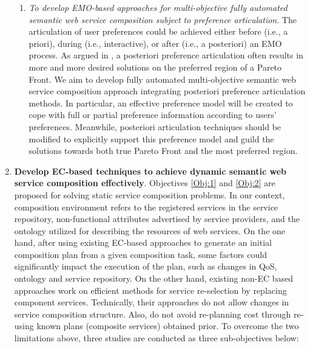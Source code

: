 \begin{enumerate}
\begin{enumerate}
    \item \emph{To develop EMO-based approaches for multi-objective fully automated semantic web service composition subject to preference articulation}.  The articulation of user preferences could be achieved either before (i.e., a priori), during (i.e., interactive), or after (i.e., a posteriori) an EMO process. As argued in \cite{giagkiozis2014pareto}, a posteriori preference articulation often results in more and more desired solutions on the preferred region of a Pareto Front. We aim to develop fully automated multi-objective semantic web service composition approach integrating posteriori preference articulation methods. In particular, an effective preference model will be created to cope with full or partial preference information according to users' preferences. Meanwhile, posteriori articulation techniques should be modified to explicitly support this preference model and guild the solutions towards both true Pareto Front and the most preferred region. 

   \end{enumerate}
   
\vspace{0.5cm}
 \item \textbf{Develop EC-based techniques to achieve dynamic semantic web service composition effectively}. Objectives \ref{Obj:1} and \ref{Obj:2} are proposed for solving static service composition problems. In our context, composition environment refers to the registered services in the service repository, non-functional attributes advertised by service providers, and the ontology utilized for describing the resources of web services. On the one hand, after using existing EC-based approaches to generate an initial composition plan from a given composition task, some factors could significantly impact the execution of the plan, such as changes in QoS, ontology and service repository. On the other hand, existing non-EC based approaches \cite{nasridinov2012qos,salas2006ws,wagner2016robust,yin2010qos} work on efficient methods for service re-selection by replacing component services. Technically, their approaches do not allow changes in service composition structure. Also, do not avoid re-planning cost through re-using known plans (composite services) obtained prior. To overcome the two limitations above, three studies are conducted as three sub-objectives below:


\end{enumerate}
